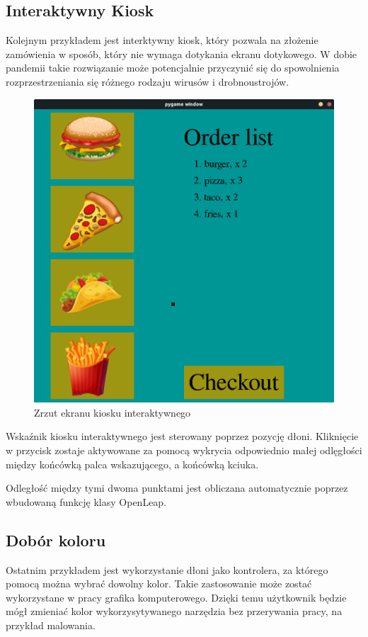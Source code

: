 \subsection{Interaktywny Kiosk}
\quad Kolejnym przykładem jest interktywny kiosk, który pozwala na złożenie zamówienia w sposób, który nie wymaga dotykania ekranu dotykowego. W dobie pandemii takie rozwiązanie może potencjalnie przyczynić się do spowolnienia rozprzestrzeniania się różnego rodzaju wirusów i drobnoustrojów. 


\begin{figure}[H]
    \begin{center}
        \includegraphics[width=15cm]{../images/checkout_window.png}
        \caption{Zrzut ekranu kiosku interaktywnego}
    \end{center}
\end{figure}

\quad Wskaźnik kiosku interaktywnego jest sterowany poprzez pozycję dłoni. Kliknięcie w przycisk zostaje aktywowane za pomocą wykrycia odpowiednio małej odlęgłości między końcówką palca wskazującego, a końcówką kciuka. 

\quad Odległość między tymi dwoma punktami jest obliczana automatycznie poprzez wbudowaną funkcję klasy OpenLeap. 

\subsection{Dobór koloru}
\quad Ostatnim przykładem jest wykorzystanie dłoni jako kontrolera, za którego pomocą można wybrać dowolny kolor. Takie zastosowanie może zostać wykorzystane w pracy grafika komputerowego. Dzięki temu użytkownik będzie mógł zmieniać kolor wykorzysytywanego narzędzia bez przerywania pracy, na przykład malowania. 


